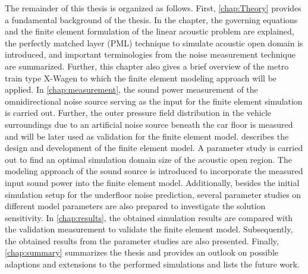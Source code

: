 The remainder of this thesis is organized as follows. First, \cref{chap:Theory} provides a fundamental background of the thesis. In the chapter, the governing equations and the finite element formulation of the linear acoustic problem are explained, the perfectly matched layer (PML) technique to simulate acoustic open domain is introduced, and important terminologies from the noise measurement technique are summarized. Further, this chapter also gives a brief overview of the metro train type X-Wagen to which the finite element modeling approach will be applied. In \cref{chap:measurement}, the sound power measurement of the omnidirectional noise source serving as the input for the finite element simulation is carried out. Further, the outer pressure field distribution in the vehicle surroundings due to an artificial noise source beneath the car floor is measured and will be later used as validation for the finite element model.  describes the design and development of the finite element model. A parameter study is carried out to find an optimal simulation domain size of the acoustic open region. The modeling approach of the sound source is introduced to incorporate the measured input sound power into the finite element model. Additionally, besides the initial simulation setup for the underfloor noise prediction, several parameter studies on different model parameters are also prepared to investigate the solution sensitivity. In \cref{chap:results}, the obtained simulation results are compared with the validation measurement to validate the finite element model. Subsequently, the obtained results from the parameter studies are also presented. Finally, \cref{chap:summary} summarizes the thesis and provides an outlook on possible adaptions and extensions to the performed simulations and lists the future work.
